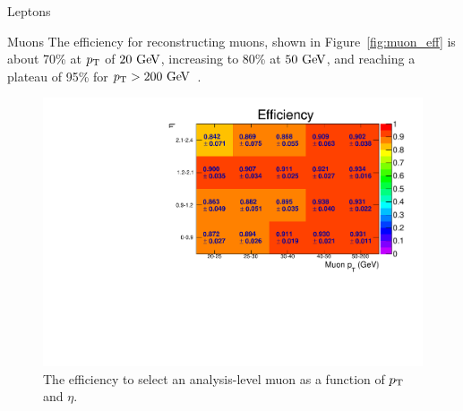 \begin{section}{Leptons}
\begin{subsection}{Muons}
The efficiency for reconstructing muons, shown in Figure~\ref{fig:muon_eff} is about 70\% at $p_{\mathrm{T}}$ of $20~\mathrm{Ge\kern -0.1em V}$, increasing to 80\% at $50~\mathrm{Ge\kern -0.1em V}$, and reaching a plateau of 95\% for $p_{\mathrm{T}} > 200~\mathrm{Ge\kern -0.1em V}$~\cite{Chatrchyan:2012xi}.

\begin{figure}[tbp!]
\centering
\includegraphics[angle=0,width=0.80\columnwidth]{fig/muon_eff.pdf}
\caption{The efficiency to select an analysis-level muon as a function of $p_{\mathrm{T}}$ and $\eta$.}
\label{fig:btag_eff}
\end{figure}

\end{subsection}

\end{section}

